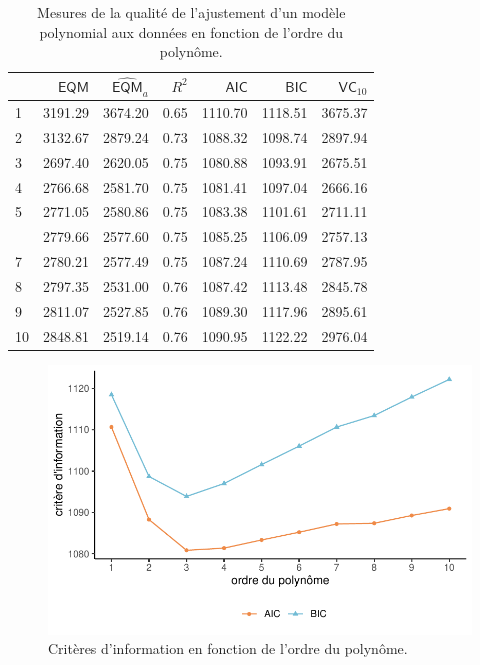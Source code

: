 \documentclass[
  11pt,
  letterpaper,
]{scrbook}
\theoremstyle{definition}
\theoremstyle{remark}
\begin{document}
\hypertarget{tbl-polynome-ajustement}{}
\begin{table}
\caption{\label{tbl-polynome-ajustement}Mesures de la qualité de l'ajustement d'un modèle polynomial aux données
en fonction de l'ordre du polynôme. }\tabularnewline

\centering
\begin{tabular}{lrrrrrr}
\toprule
  & \(\mathsf{EQM}\) & \(\widehat{\mathsf{EQM}}_a\) & \(R^2\) & \(\mathsf{AIC}\) & \(\mathsf{BIC}\) & \(\mathsf{VC}_{10}\)\\
\midrule
1 & 3191.29 & 3674.20 & 0.65 & 1110.70 & 1118.51 & 3675.37\\
2 & 3132.67 & 2879.24 & 0.73 & 1088.32 & 1098.74 & 2897.94\\
3 & 2697.40 & 2620.05 & 0.75 & 1080.88 & 1093.91 & 2675.51\\
4 & 2766.68 & 2581.70 & 0.75 & 1081.41 & 1097.04 & 2666.16\\
5 & 2771.05 & 2580.86 & 0.75 & 1083.38 & 1101.61 & 2711.11\\
\addlinespace
6 & 2779.66 & 2577.60 & 0.75 & 1085.25 & 1106.09 & 2757.13\\
7 & 2780.21 & 2577.49 & 0.75 & 1087.24 & 1110.69 & 2787.95\\
8 & 2797.35 & 2531.00 & 0.76 & 1087.42 & 1113.48 & 2845.78\\
9 & 2811.07 & 2527.85 & 0.76 & 1089.30 & 1117.96 & 2895.61\\
10 & 2848.81 & 2519.14 & 0.76 & 1090.95 & 1122.22 & 2976.04\\
\bottomrule
\end{tabular}
\end{table}

\begin{figure}[ht!]

{\centering \includegraphics[width=1\textwidth,height=\textheight]{selectionmodeles_files/figure-pdf/fig-polynome-ajustement-1.pdf}

}

\caption{\label{fig-polynome-ajustement}Critères d'information en
fonction de l'ordre du polynôme.}

\end{figure}
\end{document}
